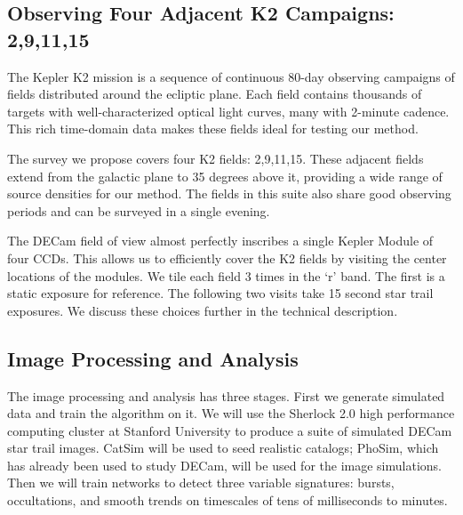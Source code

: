 \documentclass[11pt]{article}
\begin{document}
\expdesign
\subsection*{Observing Four Adjacent K2 Campaigns: 2,9,11,15}

The Kepler K2 mission is a sequence of continuous 80-day observing campaigns of fields distributed around the ecliptic plane. Each field contains thousands of targets with well-characterized optical light curves, many with 2-minute cadence. This rich time-domain data makes these fields ideal for testing our method.


The survey we propose covers four K2 fields: 2,9,11,15. These adjacent fields extend from the galactic plane to 35 degrees above it, providing a wide range of source densities for our method. The fields in this suite also share good observing periods and can be surveyed in a single evening.

The DECam field of view almost perfectly inscribes a single Kepler Module of four CCDs. This allows us to efficiently cover the K2 fields by visiting the center locations of the modules. We tile each field 3 times in the `r' band. The first is a static exposure for reference. The following two visits take 15 second star trail exposures. We discuss these choices further in the technical description. 

\subsection*{Image Processing and Analysis}

The image processing and analysis has three stages. First we generate simulated data and train the algorithm on it. We will use the Sherlock 2.0 high performance computing cluster at Stanford University to produce a suite of simulated DECam star trail images. CatSim will be used to seed realistic catalogs; PhoSim, which has already been used to study DECam, will be used for the image simulations. Then we will train networks to detect three variable signatures: bursts, occultations, and smooth trends on timescales of tens of milliseconds to minutes.
\end{document}

